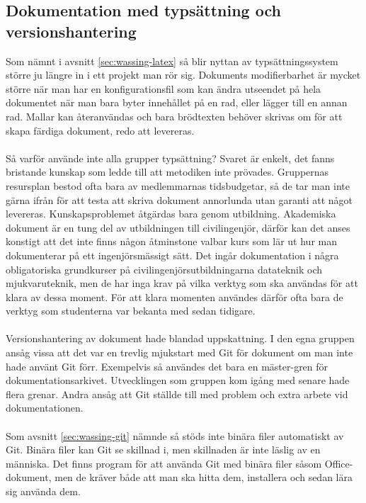 \subsection{Dokumentation med typsättning och versionshantering}
Som nämnt i avsnitt \ref{sec:wassing-latex} så blir nyttan av typsättningssystem större ju längre in i ett projekt man rör sig. Dokuments modifierbarhet är mycket större när man har en konfigurationsfil som kan ändra utseendet på hela dokumentet när man bara byter innehållet på en rad, eller lägger till en annan rad. Mallar kan återanvändas och bara brödtexten behöver skrivas om för att skapa färdiga dokument, redo att levereras.
\\ \\
Så varför använde inte alla grupper typsättning? Svaret är enkelt, det fanns bristande kunskap som ledde till att metodiken inte prövades. Gruppernas resursplan bestod ofta bara av medlemmarnas tidsbudgetar, så de tar man inte gärna ifrån för att testa att skriva dokument annorlunda utan garanti att något levereras. Kunskapsproblemet åtgärdas bara genom utbildning. Akademiska dokument är en tung del av utbildningen till civilingenjör, därför kan det anses konstigt att det inte finns någon åtminstone valbar kurs som lär ut hur man dokumenterar på ett ingenjörsmässigt sätt. Det ingår dokumentation i några obligatoriska grundkurser på civilingenjörsutbildningarna datateknik och mjukvaruteknik, men de har inga krav på vilka verktyg som ska användas för att klara av dessa moment. För att klara momenten användes därför ofta bara de verktyg som studenterna var bekanta med sedan tidigare.
\\ \\
Versionshantering av dokument hade blandad uppskattning. I den egna gruppen ansåg vissa att det var en trevlig mjukstart med Git för dokument om man inte hade använt Git förr. Exempelvis så användes det bara en mäster-gren för dokumentationsarkivet. Utvecklingen som gruppen kom igång med senare hade flera grenar. Andra ansåg att Git ställde till med problem och extra arbete vid dokumentationen.
\\ \\
Som avsnitt \ref{sec:wassing-git} nämnde så stöds inte binära filer automatiskt av Git. Binära filer kan Git se skillnad i, men skillnaden är inte läslig av en människa. Det finns program för att använda Git med binära filer såsom Office-dokument, men de kräver både att man ska hitta dem, installera och sedan lära sig använda dem.
\\ \\
